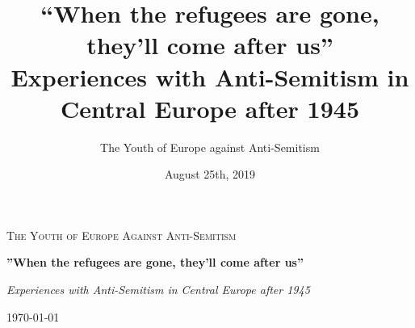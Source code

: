 \documentclass{book}
\title{``When the refugees are gone, they'll come after us''\\ Experiences with Anti-Semitism in Central Europe after 1945}
\author{The Youth of Europe against Anti-Semitism}
\date{August 25th, 2019}
\begin{document}
	\setlength{\parindent}{0pt}
	\setlength{\parskip}{1em}
\begin{titlepage}
	\centering
	{\scshape\LARGE The Youth of Europe
	Against Anti-Semitism \par}
	\vspace{1cm}
	{\huge\bfseries''When the refugees are gone, they'll come after us'' \par}
	\vspace{2cm}
	{\Large\itshape Experiences with Anti-Semitism in Central Europe after 1945\par}
	\vfill
	{\large\today\par}
\end{titlepage}
\thispagestyle{empty}
\tableofcontents













 






\nocite{*}
\printbibliography
\end{document}
